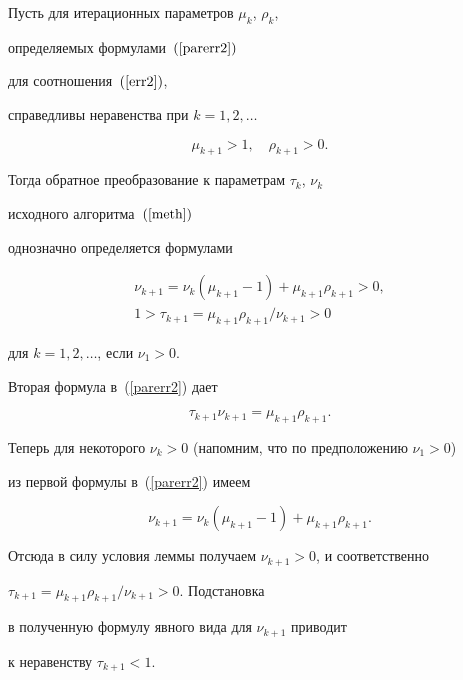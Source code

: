 \begin{lem} Пусть для итерационных параметров $\mu_k$, $\rho_k$,


определяемых формулами~$(\ref{parerr2})$


для соотношения~$(\ref{err2})$,


справедливы неравенства при $k =1, 2, \dotsc$


$$


\mu_{k+1} > 1, \quad \rho_{k+1} > 0.


$$


Тогда обратное преобразование к параметрам $\tau_{k}$, $\nu_{k}$


исходного алгоритма~$(\ref{meth})$


однозначно определяется формулами


\begin{equation}


\label{trsf}


\begin{array}{c}


\nu_{k+1} = \nu_k ( \mu_{k+1} -1 ) + \mu_{k+1}\rho_{k+1} > 0, \\


1 > \tau_{k+1} = \mu_{k+1}\rho_{k+1} / \nu_{k+1} > 0


\end{array}


\end{equation}


для $k =1, 2, \dotsc$, если $\nu_1 > 0$.


\end{lem}





\begin{pf}


Вторая формула в~(\ref{parerr2}) дает


$$


\tau_{k+1} \nu_{k+1} = \mu_{k+1}\rho_{k+1}.


$$


Теперь для некоторого $\nu_k > 0$ (напомним, что по предположению $\nu_1>0$)


из первой формулы в~(\ref{parerr2}) имеем


$$


\nu_{k+1} = \nu_k ( \mu_{k+1} -1 ) + \mu_{k+1}\rho_{k+1}.


$$


Отсюда в силу условия леммы получаем $\nu_{k+1} > 0$, и соответственно


$\tau_{k+1} = \mu_{k+1}\rho_{k+1} / \nu_{k+1} > 0$. Подстановка


в полученную формулу явного вида для $\nu_{k+1}$ приводит


к неравенству $\tau_{k+1} < 1$.


\end{pf}





